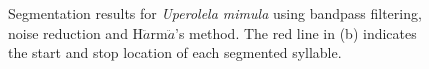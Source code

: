 \begin{figure}[htb!]
        \caption[Segmentation results based on bandpass filtering]{Segmentation results  for \textit{Uperolela mimula} using bandpass filtering, noise reduction and H$\ddot{a}$rm$\ddot{a}$'s method. The red line in (b) indicates the start and stop location of each segmented syllable.}       
        \label{fig:Ch5_segmentation}
\end{figure}






